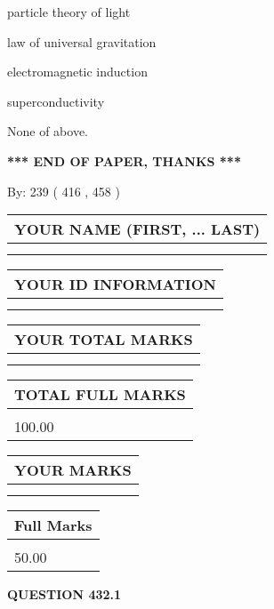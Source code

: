 \documentclass[12pt]{article}
\begin{document}
 
particle theory of light
 
 
law of universal gravitation
 
 
electromagnetic induction
 
 
superconductivity
 
 
 None of above.
 
 
   
   
\vspace{1.0in} 
{\textbf{\large{ *** END OF PAPER, THANKS *** }}} 
   
   
\hspace{1.0in} By: 
 239 ( 416 ,  458 )
   
   
   
   
\newpage 
\setcounter{page}{ 
   432001 } 
   
   
   
   
\noindent\begin{tabular}{|l|}
\hline
YOUR NAME (FIRST, ... LAST)  \\
\hline
 \\ 
 \\ 
\hline
\end{tabular}
\hspace{0.05in} \begin{tabular}{|l|}
\hline
 YOUR   ID   INFORMATION  \\
\hline
 \\ 
 \\ 
\hline
\end{tabular}
   
   
\vspace{0.2in}\noindent\begin{tabular}{|l|}
\hline
YOUR TOTAL MARKS  \\
\hline
 \\ 
 \\ 
\hline
\end{tabular}
\hspace{0.05in} \begin{tabular}{|l|}
\hline
TOTAL FULL MARKS  \\
\hline
 \\ 
100.00 \\
\hline
\end{tabular}
  
\vspace{0.2in}
  
\noindent\begin{tabular}{|l|}
\hline
 YOUR MARKS  \\
\hline
 \\ 
 \\ 
\hline
\end{tabular}
\hspace{0.05in} \begin{tabular}{|l|}
\hline
 Full Marks  \\
\hline
 \\ 
50.00 \\
\hline
\end{tabular}
{\textbf{\Large{QUESTION
432.1 
}}}
  
\end{document}
